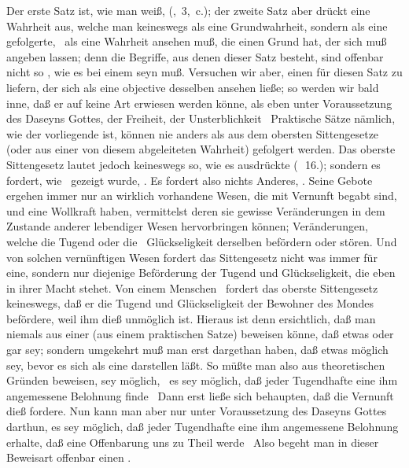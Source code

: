 \begin{aufza}
Der erste Satz ist, wie man weiß,  (, \no\,3,\ c.); der zweite Satz aber drückt eine Wahrheit aus, welche man keineswegs als eine Grundwahrheit, sondern als eine gefolgerte, \dh\ als eine Wahrheit ansehen muß, die einen Grund hat, der sich muß angeben lassen; denn die Begriffe, aus denen dieser Satz besteht, sind offenbar nicht so , wie es bei einem  seyn muß. Versuchen wir aber, einen  für diesen Satz zu liefern, der sich als eine objective  desselben ansehen ließe; so werden wir bald inne, daß er auf keine Art erwiesen werden könne, als eben unter Voraussetzung des Daseyns Gottes, der Freiheit, der Unsterblichkeit \usw\ Praktische Sätze nämlich, wie der vorliegende ist, können nie anders als aus dem obersten Sittengesetze (oder aus einer von diesem abgeleiteten Wahrheit) gefolgert werden. Das oberste Sittengesetz lautet jedoch keineswegs so, wie es  ausdrückte (\ \no\,16.); sondern es fordert, wie \ gezeigt wurde, . Es fordert also nichts Anderes, . Seine Gebote ergehen immer nur an wirklich vorhandene Wesen, die mit Vernunft begabt sind, und eine Wollkraft haben, vermittelst deren sie gewisse Veränderungen in dem Zustande anderer lebendiger Wesen hervorbringen können; Veränderungen, welche die Tugend oder die~ Glückseligkeit derselben befördern oder stören. Und von solchen vernünftigen Wesen fordert das Sittengesetz nicht was immer für eine, sondern nur diejenige Beförderung der Tugend und Glückseligkeit, die eben in ihrer Macht stehet. Von einem Menschen \zB\ fordert das oberste Sittengesetz keineswegs, daß er die Tugend und Glückseligkeit der Bewohner des Mondes befördere, weil ihm dieß unmöglich ist. Hieraus ist denn ersichtlich, daß man niemals aus einer  (aus einem praktischen Satze) beweisen könne, daß etwas  oder gar  sey; sondern umgekehrt muß man erst dargethan haben, daß etwas möglich sey, bevor es sich als eine  darstellen läßt. So müßte man also aus theoretischen Gründen beweisen,  sey möglich, \dh\ es sey möglich, daß jeder Tugendhafte eine ihm angemessene Belohnung finde \usw\ Dann erst ließe sich behaupten, daß die Vernunft dieß fordere. Nun kann man aber nur unter Voraussetzung des Daseyns Gottes darthun, es sey möglich, daß jeder Tugendhafte eine ihm angemessene Belohnung erhalte, daß eine Offenbarung uns zu Theil werde \udgl\  Also begeht man in dieser Beweisart offenbar einen .

\end{aufza}
